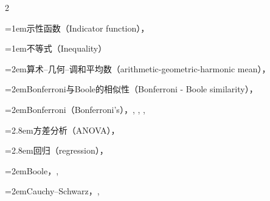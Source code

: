 \begin{multicols}{2}
\par\addvspace{2pt}
\par\noindent\hangindent=1em\hspace*{0em}\label{idx:556}示性函数（Indicator function），\hyperref[def:3.4.5]{\pageref*{def:3.4.5}}\par
\par\addvspace{2pt}
\par\noindent\hangindent=1em\hspace*{0em}\label{idx:557}不等式（Inequality）\par
\par\noindent\hangindent=2em\hspace*{1em}\label{idx:558}算术–几何–调和平均数（arithmetic-geometric-harmonic mean），\hyperref[sec:4.9.2]{\pageref*{sec:4.9.2}}\par
\par\noindent\hangindent=2em\hspace*{1em}\label{idx:559}Bonferroni与Boole的相似性（Bonferroni - Boole similarity），\hyperref[idxocc:559:41]{\pageref*{idxocc:559:41}}\par
\par\noindent\hangindent=2em\hspace*{1em}\label{idx:560}Bonferroni（Bonferroni’s），\hyperref[eq:1.2.9]{\pageref*{eq:1.2.9}}, \hyperref[eq:1.2.10]{\pageref*{eq:1.2.10}}, \hyperref[sec:1.8.1]{\pageref*{sec:1.8.1}}, \hyperref[idxocc:560:379]{\pageref*{idxocc:560:379}}\par
\par\noindent\hangindent=2.8em\hspace*{1.8em}\label{idx:561}方差分析（ANOVA），\hyperref[ex:11.2.9]{\pageref*{ex:11.2.9}}\par
\par\noindent\hangindent=2.8em\hspace*{1.8em}\label{idx:562}回归（regression），\hyperref[eq:11.3.42]{\pageref*{eq:11.3.42}}\par
\par\noindent\hangindent=2em\hspace*{1em}\label{idx:563}Boole，\hyperref[thm:1.2.11]{\pageref*{thm:1.2.11}}, \hyperref[sec:1.8.1]{\pageref*{sec:1.8.1}}\par
\par\noindent\hangindent=2em\hspace*{1em}\label{idx:564}Cauchy–Schwarz，\hyperref[thm:4.5.7]{\pageref*{thm:4.5.7}}, \hyperref[thm:4.7.3]{\pageref*{thm:4.7.3}}\par

\end{multicols}
